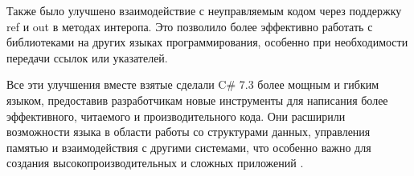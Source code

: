 \documentclass[a4paper, 12pt]{article}
\begin{document}
Также было улучшено взаимодействие с неуправляемым кодом через поддержку ref и out в методах интеропа. Это позволило более эффективно работать с библиотеками на других языках программирования, особенно при необходимости передачи ссылок или указателей.

Все эти улучшения вместе взятые сделали C\# 7.3 более мощным и гибким языком, предоставив разработчикам новые инструменты для написания более эффективного, читаемого и производительного кода. Они расширили возможности языка в области работы со структурами данных, управления памятью и взаимодействия с другими системами, что особенно важно для создания высокопроизводительных и сложных приложений \cite{csharp_language_spec}.

\printbibliography
\end{document}

